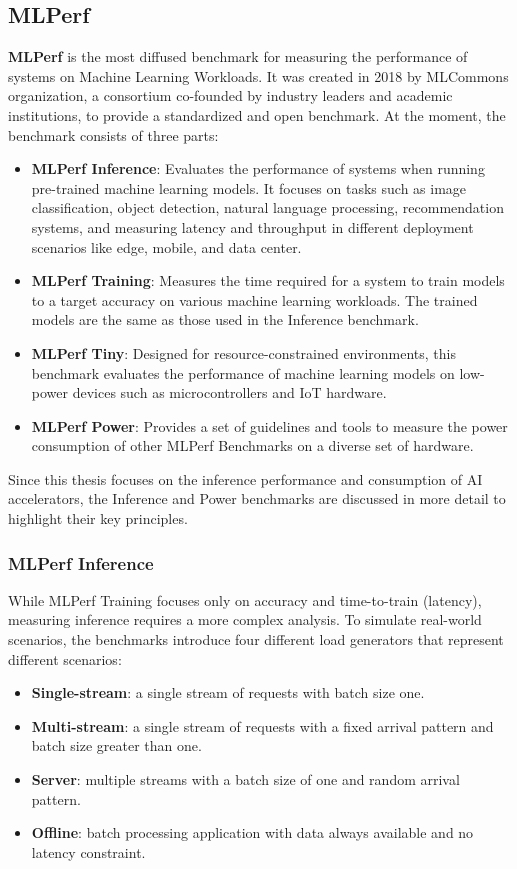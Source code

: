\documentclass[conference]{IEEEtran}
\begin{document}
\subsection{MLPerf}

\textbf{MLPerf} is the most diffused benchmark for measuring the performance of systems on Machine Learning Workloads. It was created in 2018 by MLCommons organization, a consortium co-founded by industry leaders and academic institutions, to provide a standardized and open benchmark. At the moment, the benchmark consists of three parts:  
\begin{itemize}  
    \item \textbf{MLPerf Inference}\cite{reddi2020mlperf}: Evaluates the performance of systems when running pre-trained machine learning models. It focuses on tasks such as image classification, object detection, natural language processing, recommendation systems, and measuring latency and throughput in different deployment scenarios like edge, mobile, and data center.  
    \item \textbf{MLPerf Training}\cite{mattson2020mlperf}: Measures the time required for a system to train models to a target accuracy on various machine learning workloads. The trained models are the same as those used in the Inference benchmark.
    \item \textbf{MLPerf Tiny}\cite{banbury2021mlperf}: Designed for resource-constrained environments, this benchmark evaluates the performance of machine learning models on low-power devices such as microcontrollers and IoT hardware.  
    \item \textbf{MLPerf Power}\cite{Tschand2024}: Provides a set of guidelines and tools to measure the power consumption of other MLPerf Benchmarks on a diverse set of hardware.
\end{itemize}

Since this thesis focuses on the inference performance and consumption of AI accelerators, the Inference\cite{reddi2020mlperf} and Power\cite{Tschand2024} benchmarks are discussed in more detail to highlight their key principles. 

\subsubsection{MLPerf Inference}
While MLPerf Training\cite{mattson2020mlperf} focuses only on accuracy and time-to-train (latency), measuring inference\cite{reddi2020mlperf} requires a more complex analysis. 
To simulate real-world scenarios, the benchmarks introduce four different load generators that represent different scenarios:
\begin{itemize}
\item \textbf{Single-stream}: a single stream of requests with batch size one.
\item \textbf{Multi-stream}: a single stream of requests with a fixed arrival pattern and batch size greater than one.
\item \textbf{Server}: multiple streams with a batch size of one and random arrival pattern.
\item \textbf{Offline}: batch processing application with data always available and no latency constraint.
\end{itemize}
\end{document}
